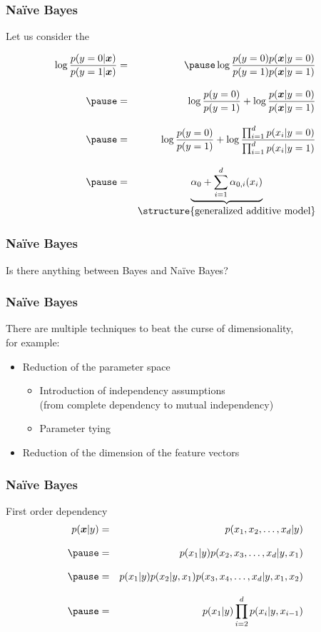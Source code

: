 \begin{frame}
  \frametitle{Na{\"i}ve Bayes}
 
  Let us consider the 

  \footnotesize
  \begin{eqnarray*}
    \log \frac{p(y=0|\vec x)}{p(y=1|\vec x)} 
      &=& \pause \log\frac{p(y=0) p(\vec x | y=0)}{p(y=1) p(\vec x | y=1)}\\[.3cm] \pause
      &=& \log\frac{p(y=0)}{p(y=1)} + \log\frac{p(\vec x | y=0)}{p(\vec x | y=1)}\\[.3cm] \pause
      &=& \log\frac{p(y=0)}{p(y=1)} + \log\frac{\prod_{i=1}^d p(x_i | y=0)}{\prod_{i=1}^d p(x_i | y=1)} \\[.3cm] \pause
      &=& \underbrace{\alpha_0 + \sum_{i=1}^d \alpha_{0,i}( x_i)}_{\mbox {\structure{generalized additive model}}}
   \end{eqnarray*}
\end{frame}


\begin{frame}
  \frametitle{Na{\"i}ve Bayes \cont}

  \begin{center}
    Is there anything between Bayes and Na{\"i}ve Bayes?
  \end{center}
\end{frame}


\begin{frame}
  \frametitle{Na{\"i}ve Bayes \cont}

  There are multiple techniques to beat the curse of dimensionality, \\
  for example:

  \begin{itemize}
     \item Reduction of the parameter space\\
       \begin{itemize}
         \item Introduction of independency assumptions \\
           (from complete dependency to mutual independency)
         \item Parameter tying
       \end{itemize}
    \item Reduction of the dimension of the feature vectors       
  \end{itemize}
\end{frame}


\begin{frame}
  \frametitle{Na{\"i}ve Bayes \cont}

  First order dependency
  \begin{eqnarray*}
    p(\vec x| y) &=& p(x_1, x_2, \dots, x_d |y) \\[.3cm] \pause
                 &=& p(x_1|y)p(x_2, x_3,\dots, x_d | y, x_1) \\[.3cm] \pause
                 &=& p(x_1|y)p(x_2|y,x_1)p(x_3,x_4,\dots, x_d | y, x_1, x_2) \\[.3cm] \pause
                 &=& p(x_1|y)\prod_{i=2}^d p(x_i|y, x_{i-1})
  \end{eqnarray*}
\end{frame}


